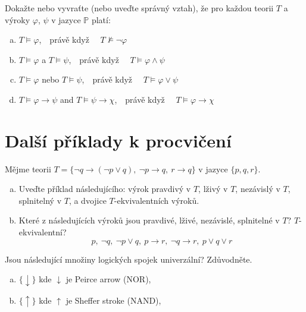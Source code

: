 \documentclass[a4paper,11pt]{amsart}
\begin{document}
\begin{problem}

    Dokažte nebo vyvraťte (nebo uveďte správný vztah), že pro každou teorii $T$ a výroky $\varphi$, $\psi$ v jazyce $\mathbb{P}$ platí:
    \begin{enumerate}[(a)]
        \item $T \models \varphi$,\ \  právě když \ \ $T \not\models \neg \varphi$
        \item $T \models \varphi$ a $T \models \psi$,\ \ právě když \ \ $T \models \varphi \wedge \psi$
        \item $T \models \varphi$ nebo $T \models \psi$,\ \ právě když \ \ $T \models \varphi \vee \psi$
        \item $T \models \varphi \to \psi$ and $T \models \psi \to \chi$,\ \ právě když \ \ $T \models \varphi \to \chi$
    \end{enumerate}

    \begin{solution}
            
    \end{solution}
    
\end{problem}


\section*{Další příklady k procvičení}


\begin{problem}
        
    Mějme teorii $T=\{\neg q \to (\neg p \vee q),\ \neg p \to q,\ r \to q\}$ v jazyce $\{p, q, r\}$.
    \begin{enumerate}[(a)]
        \item Uveďte příklad následujícího: výrok pravdivý v $T$, lživý v $T$, nezávislý v $T$, splnitelný v $T$, a dvojice $T$-ekvivalentních výroků.
        \item Které z následujících výroků jsou pravdivé, lživé, nezávislé, splnitelné v $T$? $T$-ekvivalentní? 
        $$
        p, \ \neg q, \ \neg p\vee q, \ p\to r,\ \neg q\to r, \ p\vee q\vee r
        $$
    \end{enumerate}

\end{problem}


\begin{problem} 
    
    Jsou následující množiny logických spojek univerzální? Zdůvodněte.
    \begin{enumerate}[(a)]
        \item $\{\downarrow\}$ kde $\downarrow$ je Peirce arrow (NOR),
        \item $\{\uparrow\}$ kde $\uparrow$ je Sheffer stroke (NAND),
    \end{enumerate}

\end{problem}
\end{document}
